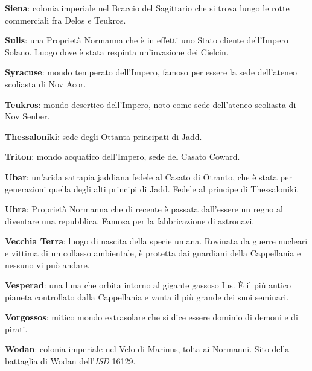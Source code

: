 \textbf{Siena}: colonia imperiale nel Braccio del Sagittario che si
trova lungo le rotte commerciali fra Delos e Teukros.

\textbf{Sulis}: una Proprietà Normanna che è in effetti uno Stato
cliente dell'Impero Solano. Luogo dove è stata respinta un'invasione dei
Cielcin.

\textbf{Syracuse}: mondo temperato dell'Impero, famoso per essere la
sede dell'ateneo scoliasta di Nov Acor.

\textbf{Teukros}: mondo desertico dell'Impero, noto come sede
dell'ateneo scoliasta di Nov Senber.

\textbf{Thessaloniki}: sede degli Ottanta principati di Jadd.

\textbf{Triton}: mondo acquatico dell'Impero, sede del Casato Coward.

\textbf{Ubar}: un'arida satrapia jaddiana fedele al Casato di Otranto,
che è stata per generazioni quella degli alti principi di Jadd. Fedele
al principe di Thessaloniki.

\textbf{Uhra}: Proprietà Normanna che di recente è passata dall'essere
un regno al diventare una repubblica. Famosa per la fabbricazione di
astronavi.

\textbf{Vecchia Terra}: luogo di nascita della specie umana. Rovinata da
guerre nucleari e vittima di un collasso ambientale, è protetta dai
guardiani della Cappellania e nessuno vi può andare.

\textbf{Vesperad}: una luna che orbita intorno al gigante gassoso Ius. È
il più antico pianeta controllato dalla Cappellania e vanta il più
grande dei suoi seminari.

\textbf{Vorgossos}: mitico mondo extrasolare che si dice essere dominio
di demoni e di pirati.

\textbf{Wodan}: colonia imperiale nel Velo di Marinus, tolta ai
Normanni. Sito della battaglia di Wodan
dell'\textit{ISD} 16129.

\newpage\blankpage